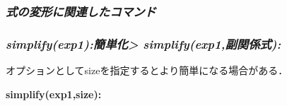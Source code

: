 \documentclass{article}
\begin{document}
\subsubsection{\textbf{\textit{式の変形に関連したコマンド}}}
\subsubsection{\textit{simplify(exp1):}\textit{簡単化> simplify(exp1,副関係式):}}
\begin{maplegroup}
\begin{mapleinput}
\end{mapleinput}
\mapleresult
\begin{maplelatex}
\end{maplelatex}
\end{maplegroup}
\begin{maplegroup}
\begin{mapleinput}
\end{mapleinput}
\mapleresult
\begin{maplelatex}
\end{maplelatex}
\mapleresult
\begin{maplelatex}
\end{maplelatex}
\end{maplegroup}
\begin{maplegroup}
\begin{mapleinput}
\end{mapleinput}
\mapleresult
\begin{maplelatex}
\end{maplelatex}
\end{maplegroup}
\begin{maplegroup}
\begin{Maple Normal}{
オプションとしてsizeを指定するとより簡単になる場合がある．}\end{Maple Normal}

\textbf{simplify(exp1,size):}\end{maplegroup}
\end{document}
